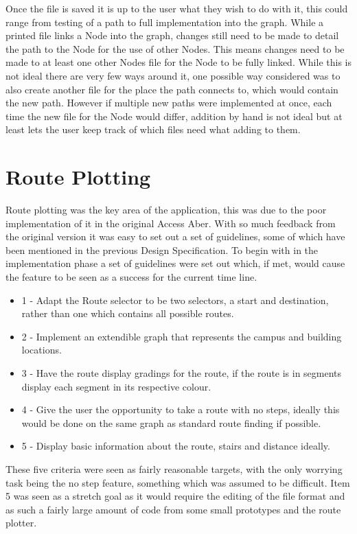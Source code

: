 Once the file is saved it is up to the user what they wish to do with it, this could range from testing of a path to full implementation into the graph. While a printed file links a Node into the graph, changes still need to be made to detail the path to the Node for the use of other Nodes. This means changes need to be made to at least one other Nodes file for the Node to be fully linked. While this is not ideal there are very few ways around it, one possible way considered was to also create another file for the place the path connects to, which would contain the new path. However if multiple new paths were implemented at once, each time the new file for the Node would differ, addition by hand is not ideal but at least lets the user keep track of which files need what adding to them. 

\section{Route Plotting}
Route plotting was the key area of the application, this was due to the poor implementation of it in the original Access Aber\cite{aa}. With so much feedback from the original version it was easy to set out a set of guidelines, some of which have been mentioned in the previous Design Specification. To begin with in the implementation phase a set of guidelines were set out which, if met, would cause the feature to be seen as a success for the current time line. 

\begin{itemize}
	\item 1 - Adapt the Route selector to be two selectors, a start and destination, rather than one which contains all possible routes.
	\item 2 - Implement an extendible graph that represents the campus and building locations.
	\item 3 - Have the route display gradings for the route, if the route is in segments display each segment in its respective colour.
	\item 4 - Give the user the opportunity to take a route with no steps, ideally this would be done on the same graph as standard route finding if possible.
	\item 5 - Display basic information about the route, stairs and distance ideally.  
\end{itemize}

These five criteria were seen as fairly reasonable targets, with the only worrying task being the no step feature, something which was assumed to be difficult. Item 5 was seen as a stretch goal as it would require the editing of the file format and as such a fairly large amount of code from some small prototypes and the route plotter.
